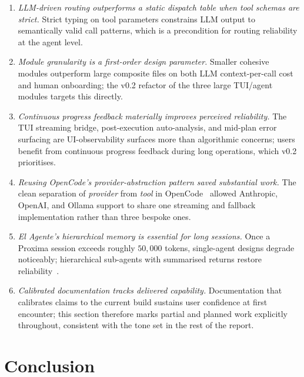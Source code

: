 \documentclass[11pt,a4paper]{article}
\begin{document}
\begin{enumerate}[leftmargin=1.5cm]
  \item \emph{LLM-driven routing outperforms a static dispatch table when
        tool schemas are strict.} Strict typing on tool parameters constrains
        LLM output to semantically valid call patterns, which is a precondition
        for routing reliability at the agent level.
  \item \emph{Module granularity is a first-order design parameter.} Smaller
        cohesive modules outperform large composite files on both LLM
        context-per-call cost and human onboarding; the v0.2 refactor of the
        three large TUI/agent modules targets this directly.
  \item \emph{Continuous progress feedback materially improves perceived
        reliability.} The TUI streaming bridge, post-execution auto-analysis,
        and mid-plan error surfacing are UI-observability surfaces more than
        algorithmic concerns; users benefit from continuous progress feedback
        during long operations, which v0.2 prioritises.
  \item \emph{Reusing OpenCode's provider-abstraction pattern saved substantial
        work.} The clean separation of \emph{provider} from \emph{tool} in
        OpenCode~\cite{opencode2025} allowed Anthropic, OpenAI, and Ollama
        support to share one streaming and fallback implementation rather than
        three bespoke ones.
  \item \emph{El Agente's hierarchical memory is essential for long sessions.}
        Once a Proxima session exceeds roughly $50{,}000$ tokens, single-agent
        designs degrade noticeably; hierarchical sub-agents with summarised
        returns restore reliability~\cite{zou2025elagente}.
  \item \emph{Calibrated documentation tracks delivered capability.}
        Documentation that calibrates claims to the current build sustains user
        confidence at first encounter; this section therefore marks partial and
        planned work explicitly throughout, consistent with the tone set in the
        rest of the report.
\end{enumerate}

\section{Conclusion}
\label{sec:conclusion}
\end{document}
